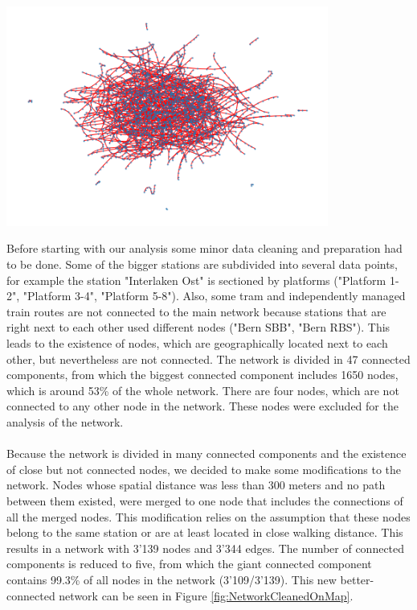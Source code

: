 \documentclass{Resources/netsci-project}
\begin{document}
\begin{center}
    \centering
    \includegraphics[width=300pt]{Resources/Network_no_map}
    \label{fig:NetworkNoMap}
\end{center}
\noindent
Before starting with our analysis some minor data cleaning and preparation had to be done. Some of the bigger stations are subdivided into several data points, for example the station "Interlaken Ost" is sectioned by platforms ("Platform 1-2", "Platform 3-4", "Platform 5-8"). Also, some tram and independently managed train routes are not connected to the main network because stations that are right next to each other used different nodes ("Bern SBB", "Bern RBS"). This leads to the existence of nodes, which are geographically located next to each other, but nevertheless are not connected. The network is divided in 47 connected components, from which the biggest connected component includes 1650 nodes, which is around 53\% of the whole network. There are four nodes, which are not connected to any other node in the network. These nodes were excluded for the analysis of the network.
\\~\\
Because the network is divided in many connected components and the existence of close but not connected nodes, we decided to make some modifications to the network. Nodes whose spatial distance was less than 300 meters and no path between them existed, were merged to one node that includes the connections of all the merged nodes. This modification relies on the assumption that these nodes belong to the same station or are at least located in close walking distance. This results in a network with 3'139 nodes and 3'344 edges. The number of connected components is reduced to five, from which the giant connected component contains 99.3\% of all nodes in the network (3’109/3’139). This new better-connected network can be seen in Figure \ref{fig:NetworkCleanedOnMap}.
\end{document}
